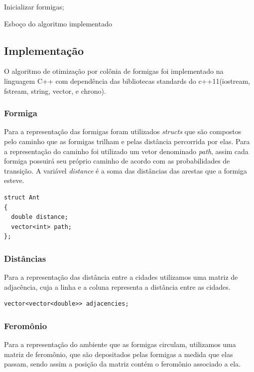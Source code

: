 \documentclass[a4paper, 12pt]{article}
\begin{document}
\begin{algorithm}[h]
\SetAlgoLined
{}

Inicializar formigas; \\
\caption{Esboço do algoritmo implementado}
\label{alg:algoritmo1}
\end{algorithm}
\setlength{\parskip}{0.0cm}


\subsection{Implementação}
O algoritmo de otimização por colônia de formigas foi implementado na linguagem C++ com dependência das bibliotecas standards do c++11(iostream, fstream, string, vector, e chrono). 


\subsubsection{Formiga}
Para a representação das formigas foram utilizados \textit{structs} que são compostos pelo caminho que as formigas trilham e pelas distância percorrida por elas. Para a representação do caminho foi utilizado um vetor denominado \textit{path}, assim cada formiga possuirá seu próprio caminho de acordo com as probabilidades de transição. A variável \textit{distance} é a soma das distâncias das arestas que a formiga esteve.

\begin{lstlisting}
struct Ant 
{
  double distance;
  vector<int> path;
};
\end{lstlisting}

\subsubsection{Distâncias}
Para a representação das distância entre a cidades utilizamos uma matriz de adjacência, cuja a linha e a coluna representa a distância entre as cidades.
\begin{lstlisting}
vector<vector<double>> adjacencies;
\end{lstlisting}

\subsubsection{Feromônio}
Para a representação do ambiente que as formigas circulam, utilizamos uma matriz de feromônio, que são depositados pelas formigas a medida que elas passam, sendo assim a posição da matriz contém o feromônio associado a ela.
\end{document}
